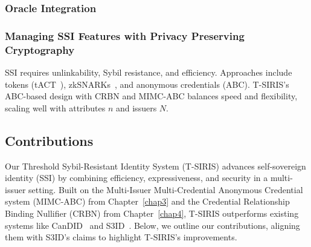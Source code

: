 \subsubsection*{Oracle Integration}


\subsubsection*{Managing SSI Features with Privacy Preserving Cryptography}
SSI requires unlinkability, Sybil resistance, and efficiency. Approaches include tokens (tACT~\cite{rabaninejad_attribute-based_2024}), zkSNARKs~\cite{rosenberg_zk-creds_2022}, and anonymous credentials (ABC). T-SIRIS’s ABC-based design with CRBN and MIMC-ABC balances speed and flexibility, scaling well with attributes $n$ and issuers $N$.


\subsection{Contributions}
\label{sec:tsiris_contributions}

Our Threshold Sybil-Resistant Identity System (T-SIRIS) advances self-sovereign identity (SSI) by combining efficiency, expressiveness, and security in a multi-issuer setting. Built on the Multi-Issuer Multi-Credential Anonymous Credential system (MIMC-ABC) from Chapter~\ref{chap3} and the Credential Relationship Binding Nullifier (CRBN) from Chapter~\ref{chap4}, T-SIRIS outperforms existing systems like CanDID~\cite{maram_candid_2020} and S3ID~\cite{rabaninejad_attribute-based_2024}. Below, we outline our contributions, aligning them with S3ID’s claims to highlight T-SIRIS’s improvements.

